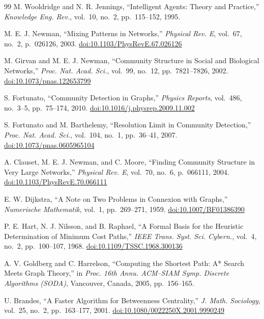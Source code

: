 \begin{thebibliography}{99}
M. Wooldridge and N. R. Jennings, ``Intelligent Agents: Theory and Practice,''
\textit{Knowledge Eng. Rev.}, vol.~10, no.~2, pp.~115--152, 1995.

M. E. J. Newman, ``Mixing Patterns in Networks,''
\textit{Physical Rev. E}, vol.~67, no.~2, p.~026126, 2003.
\href{https://doi.org/10.1103/PhysRevE.67.026126}{doi:10.1103/PhysRevE.67.026126}

M. Girvan and M. E. J. Newman, ``Community Structure in Social and Biological Networks,''
\textit{Proc. Nat. Acad. Sci.}, vol.~99, no.~12, pp.~7821--7826, 2002.
\href{https://doi.org/10.1073/pnas.122653799}{doi:10.1073/pnas.122653799}

S. Fortunato, ``Community Detection in Graphs,''
\textit{Physics Reports}, vol.~486, no.~3--5, pp.~75--174, 2010.
\href{https://doi.org/10.1016/j.physrep.2009.11.002}{doi:10.1016/j.physrep.2009.11.002}

S. Fortunato and M. Barthelemy, ``Resolution Limit in Community Detection,''
\textit{Proc. Nat. Acad. Sci.}, vol.~104, no.~1, pp.~36--41, 2007.
\href{https://doi.org/10.1073/pnas.0605965104}{doi:10.1073/pnas.0605965104}

A. Clauset, M. E. J. Newman, and C. Moore, ``Finding Community Structure in Very Large Networks,''
\textit{Physical Rev. E}, vol.~70, no.~6, p.~066111, 2004.
\href{https://doi.org/10.1103/PhysRevE.70.066111}{doi:10.1103/PhysRevE.70.066111}

E. W. Dijkstra, ``A Note on Two Problems in Connexion with Graphs,''
\textit{Numerische Mathematik}, vol.~1, pp.~269--271, 1959.
\href{https://doi.org/10.1007/BF01386390}{doi:10.1007/BF01386390}

P. E. Hart, N. J. Nilsson, and B. Raphael,
``A Formal Basis for the Heuristic Determination of Minimum Cost Paths,''
\textit{IEEE Trans. Syst. Sci. Cybern.}, vol.~4, no.~2, pp.~100--107, 1968.
\href{https://doi.org/10.1109/TSSC.1968.300136}{doi:10.1109/TSSC.1968.300136}

A. V. Goldberg and C. Harrelson,
``Computing the Shortest Path: A* Search Meets Graph Theory,''
in \textit{Proc. 16th Annu. ACM--SIAM Symp. Discrete Algorithms (SODA)},
Vancouver, Canada, 2005, pp.~156--165.

U. Brandes, ``A Faster Algorithm for Betweenness Centrality,''
\textit{J. Math. Sociology}, vol.~25, no.~2, pp.~163--177, 2001.
\href{https://doi.org/10.1080/0022250X.2001.9990249}{doi:10.1080/0022250X.2001.9990249}


\end{thebibliography}
